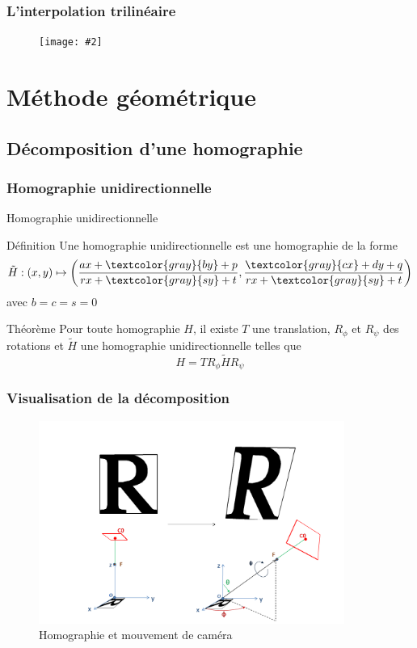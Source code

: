 \documentclass[c,12pt]{beamer}
\newcommand{\image}[2]{\begin{figure} \texttt{[image: \#2]}\end{figure}}
\newcommand{\gray}{\textcolor{gray}}
\newcommand{\fram}[2]{\begin{frame} \frametitle{#1} #2 \end{frame}}
\begin{document}
 
 \fram{L'interpolation trilinéaire}{\image{0.5}{intertri.jpg}}
 
     
     
     
     
     
\section{Méthode géométrique}
 
 \subsection{Décomposition d'une homographie}

  \subsubsection{Homographie unidirectionnelle}

  \begin{frame}{Homographie unidirectionnelle}
   \begin{block}{Définition}
    Une homographie unidirectionnelle est une homographie de la forme
    \[\tilde H : (x,y) \mapsto \left(\frac{ax+\gray{by}+p}{rx+\gray{sy}+t},\frac{\gray{cx}+dy+q}{rx+\gray{sy}+t}\right)\]
    avec $b=c=s=0$
   \end{block}
   \begin{block}{Théorème}
    Pour toute homographie $H$, il existe $T$ une translation, $R_\phi$ et $R_\psi$ des rotations et $\tilde H$ une homographie unidirectionnelle telles que
    \[H = T R_\phi \tilde H R_\psi\]
   \end{block}
  \end{frame}
  

  
\subsubsection{Visualisation de la décomposition}

  \begin{frame}
  \begin{figure}
   \centering
   \includegraphics[width=100mm]{beamer_decompo_all.png}
   \caption{Homographie et mouvement de caméra}
  \end{figure}
  \end{frame}
\end{document}
